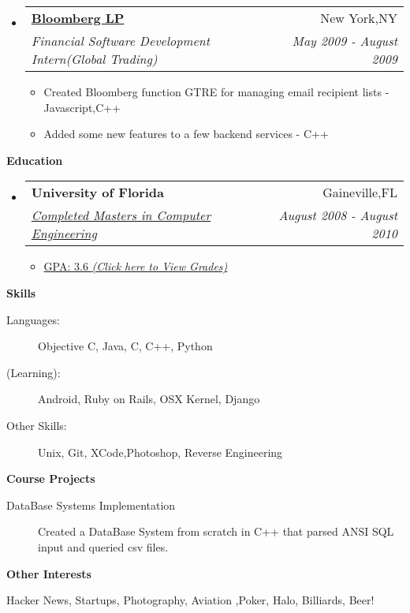 \documentclass[letterpaper,11pt]{article}
\makeatletter
\newcommand{\resitem}[1]{\item #1 \vspace{-2pt}}
\newcommand{\resheading}[1]{{\large \colorbox{mygrey}{\begin{minipage}{\textwidth}{\textbf{#1 \vphantom{p\^{E}}}}\end{minipage}}}}
\newcommand{\ressubheading}[4]{
\begin{tabular*}{7.0in}{l@{\extracolsep{\fill}}r}
		\textbf{#1} & #2 \\
		\textit{#3} & \textit{#4} \\
\end{tabular*}\vspace{-6pt}}
\makeatother
\begin{document}
\begin{itemize}
\item
    \ressubheading{\href{http://www.bloomberg.com}{Bloomberg LP}}{New York,NY}{Financial Software Development Intern(Global Trading)}{May 2009 - August 2009}
    \begin{itemize}
        \resitem{Created Bloomberg function GTRE for managing email recipient lists - Javascript,C++}
        \resitem{Added some new features to a few backend services - C++ }
    \end{itemize}
\end{itemize}

	
\resheading{Education}
\begin{itemize}
\item
    \ressubheading{University of Florida}{Gaineville,FL}{\href{http://dl.dropbox.com/u/23360122/UF_Grades.pdf}{Completed Masters in Computer Engineering}}{August 2008 - August 2010}
    \begin{itemize}
        \resitem{\href{http://dl.dropbox.com/u/23360122/UF_Grades.pdf}{GPA: 3.6 \emph{(Click here to View Grades)}}}
    \end{itemize}
\end{itemize}

\resheading{Skills}
\begin{description}
\item[Languages:]
Objective C, Java, C, C++, Python
\item[(Learning):]
Android, Ruby on Rails, OSX Kernel, Django
\item[Other Skills:]
Unix, Git, XCode,Photoshop, Reverse Engineering 
\end{description}

\resheading{Course Projects}
\begin{description}
\item[DataBase Systems Implementation] Created a DataBase System from scratch in C++ that parsed ANSI SQL input and queried csv files.
\end{description}


\resheading{Other Interests}
\begin{description}
\item Hacker News, Startups, Photography, Aviation ,Poker, Halo, Billiards, Beer!
\end{description}
\end{document}
